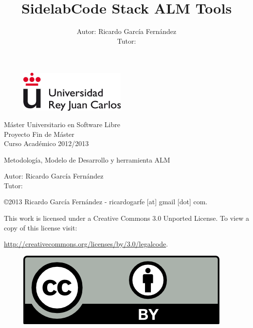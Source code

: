 \documentclass[a4paper, 12pt]{book}
\title{\textbf{SidelabCode Stack ALM Tools}}
\author{Autor: Ricardo Garc\'ia Fern\'andez
\\Tutor: }
\begin{document}
\renewcommand{\refname}{Bibliograf\'ia}  %
\renewcommand{\appendixname}{Ap\'endice}

\begin{titlepage}
\begin{center}

\begin{figure}[h]
    \begin{center}
        \includegraphics{urjc}
        \label{fig:urjc}
    \end{center}
\end{figure}

\begin{center}
\large
M\'aster Universitario en Software Libre
\\ Proyecto Fin de M\'aster
\\Curso Acad\'emico 2012/2013
\end{center}

\vspace{2cm}

\begin{center}

\LARGE
Metodolog\'ia, Modelo de Desarrollo y herramienta ALM

\large
Autor: Ricardo Garc\'ia Fern\'andez
\\Tutor:
\end{center}

\vfill

\begin{flushright}
\small
    \copyright 2013 Ricardo Garc\'ia Fern\'andez - ricardogarfe [at] gmail [dot] com.

    This work is licensed under a Creative Commons 3.0 Unported License.
    To view a copy of this license visit:
 
    \url{http://creativecommons.org/licenses/by/3.0/legalcode}.
\end{flushright}

\begin{figure}[h]
    \begin{flushright}	
        \includegraphics{by}
        \label{fig:by}
    \end{flushright}
\end{figure}

\end{center}
\end{titlepage}
\end{document}
